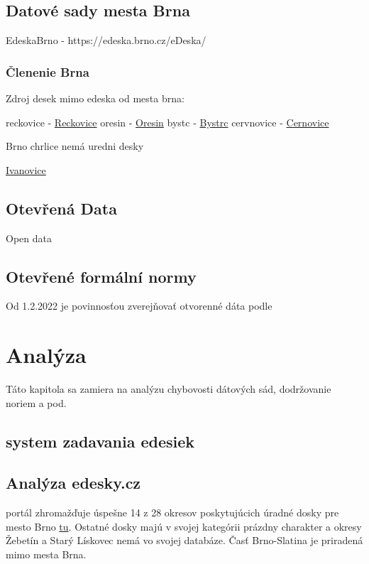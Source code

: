 

\section{Datové sady mesta Brna}
EdeskaBrno - https://edeska.brno.cz/eDeska/



\subsection{Členenie Brna}


Zdroj desek mimo edeska od mesta brna: 

reckovice - \href{http://www.udeska.info/deska.php?login=reckovice}{Reckovice}
oresin - \href{https://www.brno-oresin.cz/uredni-deska.asp}{Oresin}
bystc - \href{https://www.bystrc.cz/uredni-deska.html}{Bystrc}
cervnovice - \href{https://www.cernov.cz/vismo/zobraz_dok.asp?id\_org=2052&id\_ktg=1003}{Cernovice} 

Brno chrlice nemá uredni desky

\href{https://www.mcivanovice.cz/uredni-deska}{Ivanovice}








\section{Otevřená Data}
Open data

\section{Otevřené formální normy}
Od 1.2.2022 je povinnosťou zverejňovať otvorenné dáta podle \cite{ofnUredeniDesky}



\chapter{Analýza}
\label{Analysis}
Táto kapitola sa zamiera na analýzu chybovosti dátových sád, dodržovanie noriem a pod.

\section{system zadavania edesiek}


\section{Analýza edesky.cz}
portál zhromažďuje úspešne 14 z 28 okresov poskytujúcich úradné dosky pre mesto Brno \href{https://edesky.cz/dokumenty?zdroj=104}{tu}. Ostatné dosky majú v svojej kategórii prázdny charakter a okresy Žebetín a Starý Lískovec nemá vo svojej databáze. Časť Brno-Slatina je priradená mimo mesta Brna.

